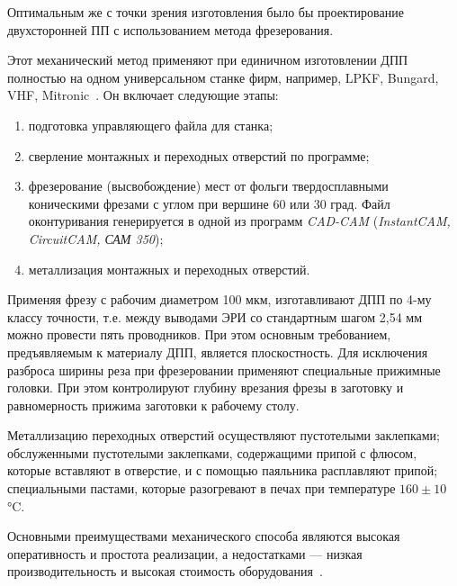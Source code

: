 
Оптимальным же с точки зрения изготовления было бы проектирование
двухсторонней ПП с использованием метода фрезерования.

Этот механический метод применяют при единичном изготовлении ДПП
полностью на одном универсальном станке фирм, например, LPKF, Bungard,
VHF, Mitronic~\cite{PirogovaEngineering}.
Он включает следующие этапы:
\begin{enumerate}
\item подготовка управляющего файла для станка;
  
\item сверление монтажных и переходных отверстий по программе;
\item фрезерование (высвобождение) мест от фольги твердосплавными коническими фрезами
  с углом при вершине 60 или 30 град.
  Файл оконтуривания генерируется в одной из программ \textit{CAD-CAM}
  (\textit{InstantCAM, CircuitCAM, САМ 350});
  
\item металлизация монтажных и переходных отверстий.

\end{enumerate}

Применяя фрезу с рабочим диаметром 100 мкм, изготавливают ДПП по 4-му
классу точности, т.е. между выводами ЭРИ со стандартным шагом 2,54 мм
можно провести пять проводников.  При этом основным требованием,
предъявляемым к материалу ДПП, является плоскостность.  Для исключения
разброса ширины реза при фрезеровании применяют специальные прижимные
головки.  При этом контролируют глубину врезания фрезы в заготовку и
равномерность прижима заготовки к рабочему столу.

Металлизацию переходных отверстий осуществляют пустотелыми заклепками;
обслуженными пустотелыми заклепками, содержащими припой с флюсом,
которые вставляют в отверстие, и с помощью паяльника расплавляют
припой; специальными пастами, которые разогревают в
печах при температуре $160 \pm 10$°C.

Основными преимуществами механического способа являются высокая
оперативность и простота реализации, а недостатками — низкая
производительность и высокая стоимость
оборудования~\cite{PirogovaEngineering}.

